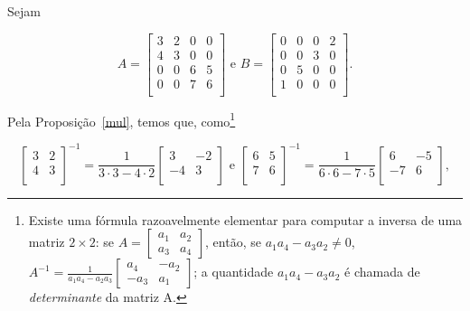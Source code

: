 \documentclass[leqno]{article}
\begin{document}
\begin{enumerate}
\begin{sol} 
	Sejam 

	\begin{equation*} 
		A = 
		\begin{bmatrix} 
			3 & 2 & 0 & 0 \\ 
			4 & 3 & 0 & 0 \\ 
			0 & 0 & 6 & 5 \\ 
			0 & 0 & 7 & 6 \\ 
		\end{bmatrix} 
		\text{ e } 
		B = 
		\begin{bmatrix} 
			0 & 0 & 0 & 2 \\ 
			0 & 0 & 3 & 0 \\ 
			0 & 5 & 0 & 0 \\ 
			1 & 0 & 0 & 0 \\ 
		\end{bmatrix}. 
	\end{equation*} 
	
	\noindent Pela Proposição~\ref{mul}, temos que, como\footnote{Existe uma fórmula razoavelmente elementar para computar a inversa de uma matriz $2 \times 2$: se $A = \begin{bmatrix} a_{1} & a_{2} \\ a_{3} & a_{4} \end{bmatrix}$, então, se $a_{1}a_{4} - a_{3}a_{2} \neq 0$, $A^{-1} = \frac{1}{a_{1}a_{4} - a_{2}a_{3}} \begin{bmatrix} a_{4} & -a_{2} \\ -a_{3} & a_{1} \end{bmatrix}$; a quantidade $a_{1}a_{4} - a_{3}a_{2}$ é chamada de \textit{determinante} da matriz A.}  

	\begin{equation*} 
		\begin{bmatrix} 
			3 & 2 \\ 
			4 & 3 \\ 
		\end{bmatrix}^{-1} = 
		\frac{1}{3 \cdot 3 - 4 \cdot 2} 
		\begin{bmatrix} 
			3 & -2 \\ 
			-4 & 3 \\  
		\end{bmatrix} 
		\text{ e } 
		\begin{bmatrix} 
			6 & 5 \\ 
			7 & 6 \\ 
		\end{bmatrix}^{-1} = 
		\frac{1}{6 \cdot 6 - 7 \cdot 5} 
		\begin{bmatrix} 
			6 & -5 \\ 
			-7 & 6 \\ 
		\end{bmatrix},   
	\end{equation*} 
	

\end{sol}
\end{enumerate}
\end{document}
